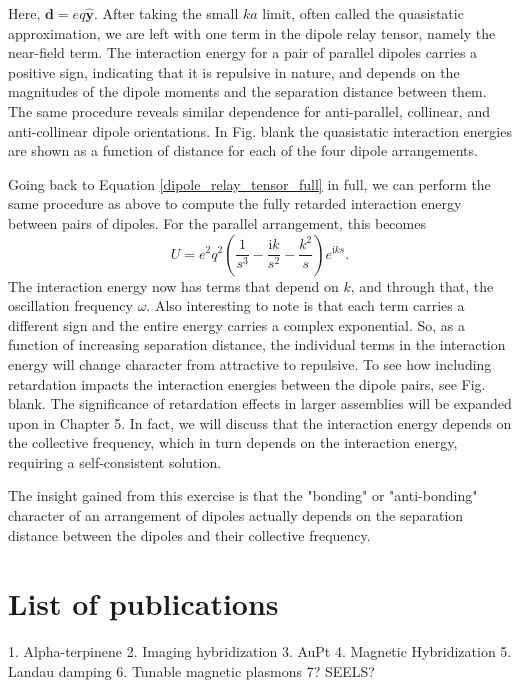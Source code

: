 \documentclass [11pt, proquest] {uwthesis}[2016/11/22]
\begin{document}
Here, $\textbf{d}=eq\hat{\textbf{y}}$. After taking the small $ka$ limit, often called the quasistatic approximation, we are left with one term in the dipole relay tensor, namely the near-field term. The interaction energy for a pair of parallel dipoles carries a positive sign, indicating that it is repulsive in nature, and depends on the magnitudes of the dipole moments and the separation distance between them. The same procedure reveals similar dependence for anti-parallel, collinear, and anti-collinear dipole orientations. In Fig. blank the quasistatic interaction energies are shown as a function of distance for each of the four dipole arrangements.

Going back to Equation \ref{dipole_relay_tensor_full} in full, we can perform the same procedure as above to compute the fully retarded interaction energy between pairs of dipoles. For the parallel arrangement, this becomes
\begin{equation}
U = e^2q^2\left(\frac{1}{s^3}-\frac{\textrm{i}k}{s^2}-\frac{k^2}{s}\right)e^{\textrm{i}ks}.
\label{int_ret}
\end{equation}
The interaction energy now has terms that depend on $k$, and through that, the oscillation frequency $\omega$. Also interesting to note is that each term carries a different sign and the entire energy carries a complex exponential. So, as a function of increasing separation distance, the individual terms in the interaction energy will change character from attractive to repulsive. To see how including retardation impacts the interaction energies between the dipole pairs, see Fig. blank. The significance of retardation effects in larger assemblies will be expanded upon in Chapter 5. In fact, we will discuss that the interaction energy depends on the collective frequency, which in turn depends on the interaction energy, requiring a self-consistent solution.

The insight gained from this exercise is that the "bonding" or "anti-bonding" character of an arrangement of dipoles actually depends on the separation distance between the dipoles and their collective frequency.

\section{List of publications}

1. Alpha-terpinene
2. Imaging hybridization
3. AuPt
4. Magnetic Hybridization 
5. Landau damping
6. Tunable magnetic plasmons
7? SEELS?
\end{document}
